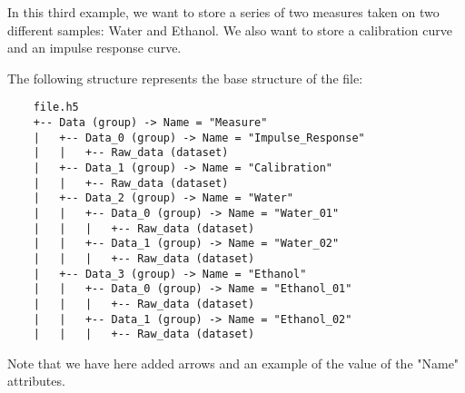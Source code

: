 In this third example, we want to store a series of two measures taken on two different samples: Water and Ethanol. We also want to store a calibration curve and an impulse response curve.

The following structure represents the base structure of the file:
\begin{verbatim}
    file.h5
    +-- Data (group) -> Name = "Measure"
    |   +-- Data_0 (group) -> Name = "Impulse_Response"
    |   |   +-- Raw_data (dataset)
    |   +-- Data_1 (group) -> Name = "Calibration"
    |   |   +-- Raw_data (dataset)
    |   +-- Data_2 (group) -> Name = "Water"
    |   |   +-- Data_0 (group) -> Name = "Water_01"
    |   |   |   +-- Raw_data (dataset)
    |   |   +-- Data_1 (group) -> Name = "Water_02"
    |   |   |   +-- Raw_data (dataset)
    |   +-- Data_3 (group) -> Name = "Ethanol"
    |   |   +-- Data_0 (group) -> Name = "Ethanol_01"
    |   |   |   +-- Raw_data (dataset)
    |   |   +-- Data_1 (group) -> Name = "Ethanol_02"
    |   |   |   +-- Raw_data (dataset)
\end{verbatim}
Note that we have here added arrows and an example of the value of the "Name" attributes.